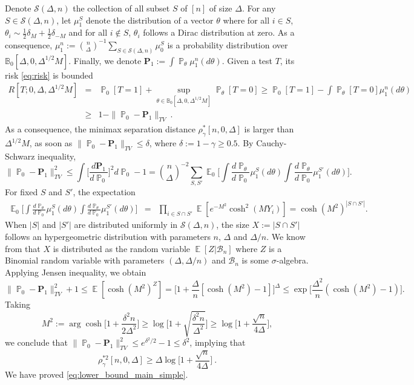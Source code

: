\documentclass[twoside,11pt]{article}
\def\beqn{\begin{eqnarray*}}
\def\eeqn{\end{eqnarray*}}
\def\cB{\mathcal{B}}
\def\cS{\mathcal{S}}
\def\bbB{\mathbb{B}}
\newcommand{\E}{\operatorname{\mathbb{E}}}
\renewcommand{\P}{\operatorname{\mathbb{P}}}
\newcommand{\<}{\langle}
\renewcommand{\>}{\rangle}
\begin{document}
 
Denote $\cS(\Delta,n)$ the collection of all subset $S$ of $[n]$ of size $\Delta$. For any $S\in \cS(\Delta,n)$, let $\mu_1^S$ denote the distribution of a vector $\theta$ where for all $i\in S$, $\theta_i\sim \frac{1}{2}\delta_{M}+ \frac{1}{2}\delta_{-M}$ and for all $i\notin S$, $\theta_i$ follows a Dirac distribution at zero. As a consequence, $\mu_1^n:= \binom{n}{\Delta}^{-1}\sum_{S\in \cS(\Delta,n)}\mu_0^S$ is a probability distribution over $\bbB_0[\Delta,0,\Delta^{1/2}M]$. Finally, we denote $\mathbf{P}_1:=\int \P_{\theta}\mu_1^{n}(d\theta)$.
Given a test $T$, its risk  \eqref{eq:risk} is bounded 
 \beqn 
 R[T;0,\Delta, \Delta^{1/2} M]&=& \P_{0}[T=1] +  \sup_{\theta \in \bbB_0[\Delta,0,\Delta^{1/2} M]}\P_{\theta}[T=0]
 \geq  \P_{0}[T=1] -   \int \P_{\theta}[T=0]\mu_1^{n}(d\theta)\\
 &\geq & 1 - \|\P_0 - \mathbf{P}_1\|_{TV}\ . 
 \eeqn 
 As a consequence, the minimax separation distance  $\rho^*_{\gamma}[n,0,\Delta]$ is larger than $\Delta^{1/2}M$, as soon as 
 $\|\P_0 - \mathbf{P}_1\|_{TV}\leq \delta $, where $\delta:=1  -\gamma\geq 0.5$.
 By Cauchy-Schwarz inequality,
 \[
 \|\P_0 - \mathbf{P}_1\|^2_{TV}\leq \int  \Big[\frac{d\mathbf{P}_1}{d\P_0}\Big]^2d\P_0- 1 = \binom{n}{\Delta}^{-2}\sum_{S,S'} \E_{0}\Big[\int \frac{d\P_\theta}{d\P_0} \mu^{S}_1(d\theta)\int \frac{d \P_\theta}{d\P_0} \mu^{S'}_1(d\theta)\Big].
 \]
For fixed $S$ and $S'$, the expectation 
 \beqn
   \E_{0}\Big[ \int \frac{d\P_\theta}{d\P_0} \mu^{S}_1(d\theta)\int \frac{d \P_\theta}{d\P_0} \mu^{S'}_1(d\theta)\Big]&= &\prod_{i\in S\cap S'}\E\left[e^{-M^2} \cosh^2(MY_i)\right]= \cosh(M^2)^{|S\cap S'|}.
 \eeqn 
When $|S|$ and $|S'|$ are distributed uniformly in $\cS(\Delta,n)$, the size $X:=|S\cap S'|$ follows an hypergeometric distribution with parameters $n$, $\Delta$ and $\Delta/n$. We know from \cite[p.173]{aldous85} that $X$ is distributed as the random variable $\E[Z|\cB_n]$ where $Z$ is a Binomial random variable with parameters $(\Delta,\Delta/n)$  and $\cB_n$ is some $\sigma$-algebra. Applying  Jensen inequality, we obtain
 \[
 \|\P_0 - \mathbf{P}_1\|^2_{TV}+1 \leq \E[\cosh(M^2)^{Z}]= \Big[1+ \frac{\Delta}{n} [\cosh(M^2)-1]\Big]^{\Delta}\leq \exp\big[\frac{\Delta^2}{n}(\cosh(M^2)-1)\big].
 \]
Taking 
\[M^2 := \arg\cosh\big[1+ \frac{\delta^2  n}{2\Delta^2}\big]\geq \log\Big[1 + \sqrt{\frac{\delta^2 n}{\Delta^2}}\Big]\geq \log\Big[1 + \frac{ \sqrt{n}}{4\Delta}\Big],\]
we conclude that $ \|\P_0 - \mathbf{P}_1\|^2_{TV}\leq e^{\delta^2/2 }-1 \leq \delta^2$, implying that 
\[
 \rho^{*2}_{\gamma}[n,0,\Delta]\geq \Delta \log\Big[1 + \frac{ \sqrt{n}}{4\Delta}\Big]\ .
\]
We have proved \eqref{eq:lower_bound_main_simple}.
 
\end{document}
